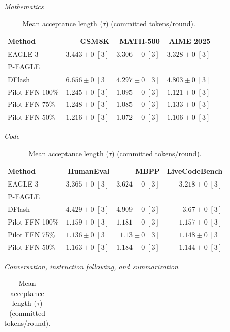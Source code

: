 \documentclass[conference,onecolumn]{IEEEtran}
\begin{document}
\begin{table}[!tp]
\centering
\small
\setlength{\tabcolsep}{3pt}
\caption{Mean acceptance length (\(\tau\)) (committed tokens/round).}
\label{tab:acceptance-length}
\textit{Mathematics}\par\smallskip
\begin{tabular}{@{}>{\raggedright\arraybackslash}p{3.7cm}rrr@{}}
\toprule
Method & GSM8K & MATH-500 & AIME 2025 \\
\midrule
EAGLE-3 & \(3.443 \pm 0\;[3]\) & \(3.306 \pm 0\;[3]\) & \(3.328 \pm 0\;[3]\) \\
P-EAGLE &  &  &  \\
DFlash & \(\mathbf{6.656} \pm 0\;[3]\) & \(\mathbf{4.297} \pm 0\;[3]\) & \(\mathbf{4.803} \pm 0\;[3]\) \\
Pilot FFN 100\% & \(1.245 \pm 0\;[3]\) & \(1.095 \pm 0\;[3]\) & \(1.121 \pm 0\;[3]\) \\
Pilot FFN 75\% & \(1.248 \pm 0\;[3]\) & \(1.085 \pm 0\;[3]\) & \(1.133 \pm 0\;[3]\) \\
Pilot FFN 50\% & \(1.216 \pm 0\;[3]\) & \(1.072 \pm 0\;[3]\) & \(1.106 \pm 0\;[3]\) \\
\bottomrule
\end{tabular}
\par\medskip
\textit{Code}\par\smallskip
\begin{tabular}{@{}>{\raggedright\arraybackslash}p{3.7cm}rrr@{}}
\toprule
Method & HumanEval & MBPP & LiveCodeBench \\
\midrule
EAGLE-3 & \(3.365 \pm 0\;[3]\) & \(3.624 \pm 0\;[3]\) & \(3.218 \pm 0\;[3]\) \\
P-EAGLE &  &  &  \\
DFlash & \(\mathbf{4.429} \pm 0\;[3]\) & \(\mathbf{4.909} \pm 0\;[3]\) & \(\mathbf{3.67} \pm 0\;[3]\) \\
Pilot FFN 100\% & \(1.159 \pm 0\;[3]\) & \(1.181 \pm 0\;[3]\) & \(1.157 \pm 0\;[3]\) \\
Pilot FFN 75\% & \(1.136 \pm 0\;[3]\) & \(1.13 \pm 0\;[3]\) & \(1.148 \pm 0\;[3]\) \\
Pilot FFN 50\% & \(1.163 \pm 0\;[3]\) & \(1.184 \pm 0\;[3]\) & \(1.144 \pm 0\;[3]\) \\
\bottomrule
\end{tabular}
\par\medskip
\textit{Conversation, instruction following, and summarization}\par\smallskip
\begin{tabular}{@{}>{\raggedright\arraybackslash}p{3.7cm}rrrr@{}}

\end{tabular}
\end{table}
\end{document}
